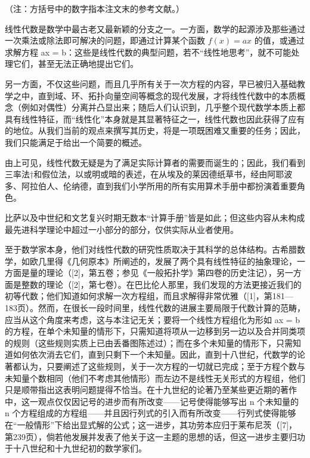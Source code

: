 \backmatter
{}

（注：方括号中的数字指本注文末的参考文献。）

线性代数是数学中最古老又最新颖的分支之一。一方面，数学的起源涉及那些通过一次乘法或除法即可解决的问题，即通过计算某个函数 \(f(x) = ax\) 的值，或通过求解方程 ax = b：这些是线性代数的典型问题，若不“线性地思考”，就不可能处理它们，甚至无法正确地提出它们。

另一方面，不仅这些问题，而且几乎所有关于一次方程的内容，早已被归入基础教学之中，直到域、环、拓扑向量空间等概念的现代发展，才将线性代数中的本质概念（例如对偶性）分离并凸显出来；随后人们认识到，几乎整个现代数学本质上都具有线性特征，而“线性化”本身就是其显著特征之一，线性代数也因此获得了应有的地位。从我们当前的观点来撰写其历史，将是一项既困难又重要的任务；因此，我们只能满足于给出一个简要的概述。

由上可见，线性代数无疑是为了满足实际计算者的需要而诞生的；因此，我们看到三率法†和假位法，以或明或暗的表述，在从埃及的莱因德纸草书，经由阿耶波多、阿拉伯人、伦纳德，直到我们小学所用的所有实用算术手册中都扮演着重要角色。

比萨以及中世纪和文艺复兴时期无数本“计算手册”皆是如此；但这些内容从未构成最先进科学理论中超过一小部分的部分，仅供实际从业者使用。

至于数学家本身，他们对线性代数的研究性质取决于其科学的总体结构。古希腊数学，如欧几里得《几何原本》所阐述的，发展了两个具有线性特征的抽象理论，一方面是量的理论（{[}2{]}，第五卷；参见《一般拓扑学》第四卷的历史注记），另一方面是整数的理论（{[}2{]}，第七卷）。在巴比伦人那里，我们发现的方法更接近我们的初等代数；他们知道如何求解一次方程组，而且求解得非常优雅（{[}1{]}，第181—183页）。然而，在很长一段时间里，线性代数的进展主要局限于代数计算的范畴，应当从这个角度来考虑，这与本注记无关；要将一个线性方程组化为形如 ax = b 的方程，在单个未知量的情形下，只需知道将项从一边移到另一边以及合并同类项的规则（这些规则实质上已由丢番图陈述过）；而在多个未知量的情形下，只需知道如何依次消去它们，直到只剩下一个未知量。因此，直到十八世纪，代数学的论著都认为，只要阐述了这些规则，关于一次方程的一切就已完成；至于方程个数与未知量个数相同（他们不考虑其他情形）而左边不是线性无关形式的方程组，他们只是顺带指出这表明问题提得不恰当。在十九世纪的论著乃至某些更近期的著作中，这一观点仅仅因记号的进步而有所改变——记号使得能够写出 n 个未知量的 n 个方程组成的方程组——并且因行列式的引入而有所改变——行列式使得能够在“一般情形”下给出显式解的公式；这一进步，其功劳本应归于莱布尼茨（{[}7{]}，第239页），倘若他发展并发表了他关于这一主题的思想的话，但这一进步主要归功于十八世纪和十九世纪初的数学家们。


